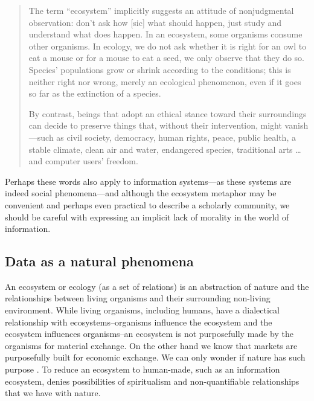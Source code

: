 \begin{quote}
The term “ecosystem” implicitly suggests an attitude of nonjudgmental observation: don't ask how [sic] what should happen, just study and understand what does happen. In an ecosystem, some organisms consume other organisms. In ecology, we do not ask whether it is right for an owl to eat a mouse or for a mouse to eat a seed, we only observe that they do so. Species' populations grow or shrink according to the conditions; this is neither right nor wrong, merely an ecological phenomenon, even if it goes so far as the extinction of a species.

By contrast, beings that adopt an ethical stance toward their surroundings can decide to preserve things that, without their intervention, might vanish—such as civil society, democracy, human rights, peace, public health, a stable climate, clean air and water, endangered species, traditional arts … and computer users' freedom. \citep{fsf_2014}
\end{quote}

Perhaps these words also apply to information systems—as these systems are indeed social phenomena—and although the ecosystem metaphor may be convenient and perhaps even practical to describe a scholarly community, we should be careful with expressing an implicit lack of morality in the world of information. 

\subsection{Data as a natural phenomena}

An ecosystem or ecology (as a set of relations) is an abstraction of nature and the relationships between living organisms and their surrounding non-living environment. While living organisms, including humans, have a dialectical relationship with ecosystems--organisms influence the ecosystem and the ecosystem influences organisms--an ecosystem is not purposefully made by the organisms for material exchange. On the other hand we know that markets are purposefully built for economic exchange. We can only wonder if nature has such purpose \citep{glacken_1967}. To reduce an ecosystem to human-made, such as an information ecosystem, denies possibilities of spiritualism and non-quantifiable relationships that we have with nature.

